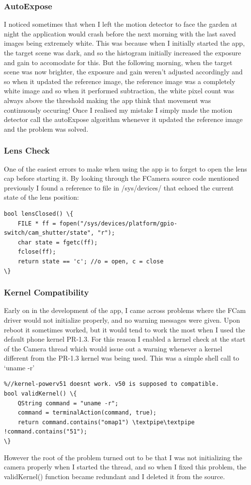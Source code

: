 \documentclass[11pt]{article} %
\begin{document}
{{\subsubsection{AutoExpose}\label{autoexpose}
I noticed sometimes that when I left the motion detector to face the garden at night the application would crash before the next morning with the last saved images being extremely white. This was because when I initially started the app, the target scene was dark, and so the histogram initially increased the exposure and gain to accomodate for this. But the following morning, when the target scene was now brighter, the exposure and gain weren’t adjusted accordingly and so when it updated the reference image, the reference image was a completely white image and so when it performed subtraction, the white pixel count was always above the threshold making the app think that movement was continuously occuring!
Once I realised my mistake I simply made the motion detector call the autoExpose algorithm whenever it updated the reference image and the problem was solved.

\subsubsection{Lens Check}
One of the easiest errors to make when using the app is to forget to open the lens cap before starting it. By looking through the FCamera source code mentioned previously I found a reference to file in /sys/devices/ that echoed the current state of the lens position:
\begin{lstlisting}
bool lensClosed() \{
    FILE * ff = fopen("/sys/devices/platform/gpio-switch/cam_shutter/state", "r");
    char state = fgetc(ff);
    fclose(ff);
    return state == 'c'; //o = open, c = close
\}
\end{lstlisting}

\subsubsection{Kernel Compatibility}
Early on in the development of the app, I came across problems where the FCam driver would not initialize properly, and no warning messages were given. Upon reboot it sometimes worked, but it would tend to work the most when I used the default phone kernel PR-1.3.
For this reason I enabled a kernel check at the start of the Camera thread which would issue out a warning whenever a kernel different from the PR-1.3 kernel was being used. This was a simple shell call to ‘uname -r’
\begin{lstlisting}
%//kernel-powerv51 doesnt work. v50 is supposed to compatible.
bool validKernel() \{
    QString command = "uname -r";
    command = terminalAction(command, true);
    return command.contains("omap1") \textpipe\textpipe !command.contains("51");
\}
\end{lstlisting}
 However the root of the problem turned out to be that I was not initializing the camera properly when I started the thread, and so when I fixed this problem, the validKernel() function became redundant and I deleted it from the source.

}}
\end{document}
